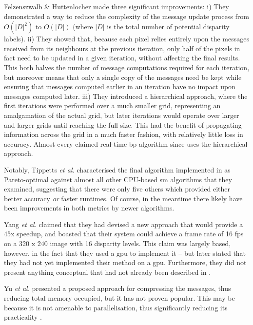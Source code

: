 Felzenszwalb \& Huttenlocher \cite{Felzenszwalb2006} made three significant improvements:  i) They demonstrated a way to reduce the complexity of the message update process from \(O(|D|^2)\) to \(O(|D|)\) (where \(|D|\) is the total number of potential disparity labels).  ii) They showed that, because each pixel relies entirely upon the messages received from its neighbours at the previous iteration, only half of the pixels in fact need to be updated in a given iteration, without affecting the final results.  This both halves the number of message computations required for each iteration, but moreover means that only a single copy of the messages need be kept while ensuring that messages computed earlier in an iteration have no impact upon messages computed later.  iii)  They introduced a hierarchical approach, where the first iterations were performed over a much smaller grid, representing an amalgamation of the actual grid, but later iterations would operate over larger and larger grids until reaching the full size.  This had the benefit of propagating information across the grid in a much faster fashion, with relatively little loss in accuracy.  Almost every claimed real-time \gls{bp} algorithm since uses the hierarchical approach.

Notably, Tippetts \textit{et al.} characterised the final algorithm implemented in \cite{Felzenszwalb2006} as Pareto-optimal against almost all other CPU-based \gls{sm} algorithms that they examined, suggesting that there were only five others which provided either better accuracy \emph{or} faster runtimes.  Of course, in the meantime there likely have been improvements in both metrics by newer algorithms.

Yang \textit{et al.} \cite{Yang2006} claimed that they had devised a new approach that would provide a 45x speedup, and boasted that their system could achieve a frame rate of 16 \gls{fps} on a 320 x 240 image with 16 disparity levels.  This claim was largely based, however, in the fact that they used a \gls{gpu} to implement it -- but later stated that they had not yet implemented their method on a \gls{gpu}.  Furthermore, they did not present anything conceptual that had not already been described in \cite{Felzenszwalb2006}. %

Yu \textit{et al.} \cite{Yu2007} presented a proposed approach for compressing the messages, thus reducing total memory occupied, but it has not proven popular.  This may be because it is not amenable to parallelisation, thus significantly reducing its practicality \cite{Yang2010}.

